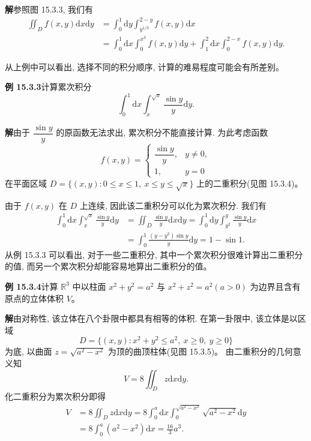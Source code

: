 \documentclass[UTF8,12pt,a4paper,fontset=fandol]{ctexart}
\begin{document}
\noindent\textbf{解}\quad 参照图 15.3.3, 我们有
\[
\begin{aligned}
  \iint_D f(x,y)\mathrm dx\mathrm dy
  &=\int_0^1\mathrm dy\int_{y^{1/3}}^{2-y}f(x,y)\mathrm dx\\
  &=\int_0^1\mathrm dx\int_0^{x^3}f(x,y)\mathrm dy
    +\int_1^2\mathrm dx\int_0^{2-x}f(x,y)\mathrm dy.
\end{aligned}
\]

从上例中可以看出, 选择不同的积分顺序, 计算的难易程度可能会有所差别。

\noindent\textbf{例 15.3.3}\quad 计算累次积分
\[
  \int_0^1\mathrm dx\int_x^{\sqrt x}\frac{\sin y}{y}\mathrm dy.
\]

\noindent\textbf{解}\quad 由于 $\dfrac{\sin y}{y}$ 的原函数无法求出, 累次积分不能直接计算. 为此考虑函数
\[
  f(x,y)=
  \begin{cases}
    \dfrac{\sin y}{y}, & y\ne0,\\
    1, & y=0
  \end{cases}
\]
在平面区域 $D=\{(x,y):0\leqslant x\leqslant1,\ x\leqslant y\leqslant\sqrt x\}$ 上的二重积分(见图 15.3.4)。

由于 $f(x,y)$ 在 $D$ 上连续, 因此该二重积分可以化为累次积分. 我们有
\[
\begin{aligned}
  \int_0^1\mathrm dx\int_x^{\sqrt x}\frac{\sin y}{y}\mathrm dy
  &=\iint_D\frac{\sin y}{y}\mathrm dx\mathrm dy
    =\int_0^1\mathrm dy\int_{y^2}^{y}\frac{\sin y}{y}\mathrm dx\\
  &=\int_0^1\frac{(y-y^2)\sin y}{y}\mathrm dy
    =1-\sin1.
\end{aligned}
\]
从例 15.3.3 可以看出, 对于一些二重积分, 其中一个累次积分很难计算出二重积分的值, 而另一个累次积分却能容易地算出二重积分的值。

\noindent\textbf{例 15.3.4}\quad 计算 $\mathbb R^3$ 中以柱面 $x^2+y^2=a^2$ 与 $x^2+z^2=a^2(a>0)$ 为边界且含有原点的立体体积 $V$。

\noindent\textbf{解}\quad 由对称性, 该立体在八个卦限中都具有相等的体积. 在第一卦限中, 该立体是以区域
\[
  D=\{(x,y):x^2+y^2\leqslant a^2,\ x\geqslant0,\ y\geqslant0\}
\]
为底, 以曲面 $z=\sqrt{a^2-x^2}$ 为顶的曲顶柱体(见图 15.3.5)。
由二重积分的几何意义知
\[
  V=8\iint_D z\mathrm dx\mathrm dy.
\]
化二重积分为累次积分即得
\[
\begin{aligned}
  V
  &=8\iint_D z\mathrm dx\mathrm dy
    =8\int_0^a\mathrm dx\int_0^{\sqrt{a^2-x^2}}\sqrt{a^2-x^2}\mathrm dy\\
  &=8\int_0^a(a^2-x^2)\mathrm dx
    =\frac{16}{3}a^3.
\end{aligned}
\]
\end{document}
